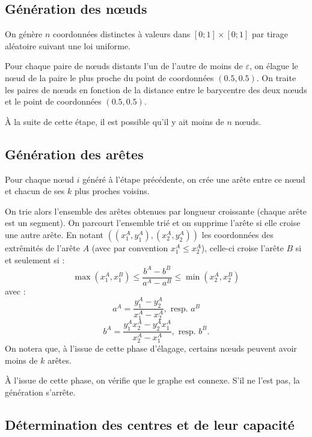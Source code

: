 \documentclass[a4paper,11pt,headings=normal]{scrartcl}
\theoremstyle{mythm}
\begin{document}
\subsection{Génération des nœuds}
\label{algorithme:noeuds}

On génère $n$ coordonnées distinctes à valeurs dans $[0 ; 1]\times[0 ;
  1]$ par tirage aléatoire suivant une loi uniforme.

Pour chaque paire de nœuds distants l'un de l'autre de moins de
$\varepsilon$, on élague le nœud de la paire le plus proche du point
de coordonnées $(0.5, 0.5)$. On traite les paires de nœuds en fonction
de la distance entre le barycentre des deux nœuds et le point de
coordonnées $(0.5, 0.5)$.

{\`A} la suite de cette étape, il est possible qu'il y ait moins de
$n$ nœuds.

\subsection{Génération des arêtes}
\label{algorithme:aretes}

Pour chaque nœud $i$ généré à l'étape précédente, on crée une arête
entre ce nœud et chacun de ses $k$ plus proches voisins.

On trie alors l'ensemble des arêtes obtenues par longueur croissante
(chaque arête est un segment). On parcourt l'ensemble trié et on
supprime l'arête si elle croise une autre arête. En notant
$((x^A_1,y^A_1), (x^A_2,y^A_2))$ les coordonnées des extrêmités de
l'arête $A$ (avec par convention $x^A_1 \leq x^A_2$), celle-ci croise
l'arête $B$ si et seulement si :
\begin{equation}
  \max \left( x^A_1, x^B_1 \right) \leq \frac{b^A - b^B}{a^A - a^B} \leq \min \left( x^A_2, x^B_2 \right)
\end{equation}
avec :
\begin{equation}
  a^A = \frac{y^A_1 - y^A_2}{x^A_1 - x^A_2}, \text{~resp.~}a^B
\end{equation}
\begin{equation}
  b^A = \frac{y^A_1 x^A_2 - y^A_2 x^A_1}{x^A_2 - x^A_1}, \text{~resp.~}b^B.
\end{equation}
On notera que, à l'issue de cette phase d'élagage, certains nœuds
peuvent avoir moins de $k$ arêtes.

À l'issue de cette phase, on vérifie que le graphe est connexe. S'il
ne l'est pas, la génération s'arrête.

\subsection{Détermination des centres et de leur capacité}
\label{algorithme:centres}
\end{document}
